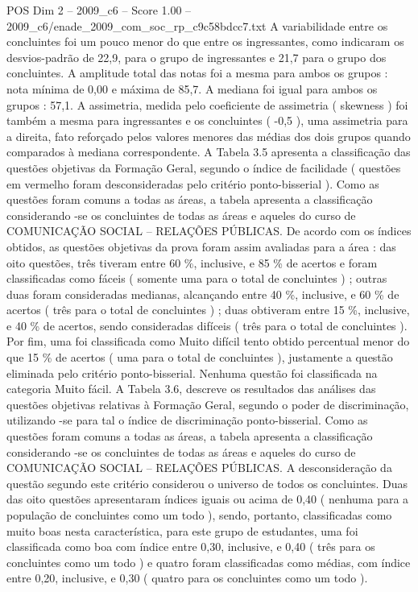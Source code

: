 \begin{textsample}{POS Dim 2 – 2009\_c6 – Score 1.00 – 2009\_c6/enade\_2009\_com\_soc\_rp\_c9c58bdcc7.txt}
A variabilidade entre os concluintes foi um pouco menor do que entre os ingressantes, como indicaram os desvios-padrão de 22,9, para o grupo de ingressantes e 21,7 para o grupo dos concluintes.
A amplitude total das notas foi a mesma para ambos os grupos : nota mínima de 0,00 e máxima de 85,7.
A mediana foi igual para ambos os grupos : 57,1.
A assimetria, medida pelo coeficiente de assimetria ( skewness ) foi também a mesma para ingressantes e os concluintes ( -0,5 ), uma assimetria para a direita, fato reforçado pelos valores menores das médias dos dois grupos quando comparados à mediana correspondente.
A Tabela 3.5 apresenta a classificação das questões objetivas da Formação Geral, segundo o índice de facilidade ( questões em vermelho foram desconsideradas pelo critério ponto-bisserial ).
Como as questões foram comuns a todas as áreas, a tabela apresenta a classificação considerando -se os concluintes de todas as áreas e aqueles do curso de COMUNICAÇÃO SOCIAL – RELAÇÕES PÚBLICAS.
De acordo com os índices obtidos, as questões objetivas da prova foram assim avaliadas para a área : das oito questões, três tiveram entre 60 \%, inclusive, e 85 \% de acertos e foram classificadas como fáceis ( somente uma para o total de concluintes ) ; outras duas foram consideradas medianas, alcançando entre 40 \%, inclusive, e 60 \% de acertos ( três para o total de concluintes ) ; duas obtiveram entre 15 \%, inclusive, e 40 \% de acertos, sendo consideradas difíceis ( três para o total de concluintes ).
Por fim, uma foi classificada como Muito difícil tento obtido percentual menor do que 15 \% de acertos ( uma para o total de concluintes ), justamente a questão eliminada pelo critério ponto-bisserial.
Nenhuma questão foi classificada na categoria Muito fácil.
A Tabela 3.6, descreve os resultados das análises das questões objetivas relativas à Formação Geral, segundo o poder de discriminação, utilizando -se para tal o índice de discriminação ponto-bisserial.
Como as questões foram comuns a todas as áreas, a tabela apresenta a classificação considerando -se os concluintes de todas as áreas e aqueles do curso de COMUNICAÇÃO SOCIAL – RELAÇÕES PÚBLICAS.
A desconsideração da questão segundo este critério considerou o universo de todos os concluintes.
Duas das oito questões apresentaram índices iguais ou acima de 0,40 ( nenhuma para a população de concluintes como um todo ), sendo, portanto, classificadas como muito boas nesta característica, para este grupo de estudantes, uma foi classificada como boa com índice entre 0,30, inclusive, e 0,40 ( três para os concluintes como um todo ) e quatro foram classificadas como médias, com índice entre 0,20, inclusive, e 0,30 ( quatro para os concluintes como um todo ).

\end{textsample}
